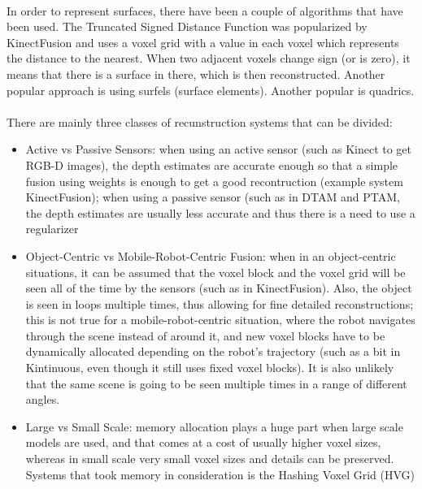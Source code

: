 \documentclass[11pt]{article}
\begin{document}
	\paragraph{}
	In order to represent surfaces, there have been a couple of algorithms that have been used. The Truncated Signed Distance Function was popularized by KinectFusion and uses a voxel grid with a value in each voxel which represents the distance to the nearest. When two adjacent voxels change sign (or is zero), it means that there is a surface in there, which is then reconstructed. Another popular approach is using surfels (surface elements). Another popular is quadrics.
	
	\paragraph{}
	There are mainly three classes of recunstruction systems that can be divided:
	\begin{itemize}
		\item Active vs Passive Sensors: when using an active sensor (such as Kinect to get RGB-D images), the depth estimates are accurate enough so that a simple fusion using weights is enough to get a good recontruction (example system KinectFusion); when using a passive sensor (such as in DTAM and PTAM, the depth estimates are usually less accurate and thus there is a need to use a regularizer
		\item Object-Centric vs Mobile-Robot-Centric Fusion: when in an object-centric situations, it can be assumed that the voxel block and the voxel grid will be seen all of the time by the sensors (such as in KinectFusion). Also, the object is seen in loops multiple times, thus allowing for fine detailed reconstructions; this is not true for a mobile-robot-centric situation, where the robot navigates through the scene instead of around it, and new voxel blocks have to be dynamically allocated depending on the robot's trajectory (such as a bit in Kintinuous, even though it still uses fixed voxel blocks). It is also unlikely that the same scene is going to be seen multiple times in a range of different angles.
		\item Large vs Small Scale: memory allocation plays a huge part when large scale models are used, and that comes at a cost of usually higher voxel sizes, whereas in small scale very small voxel sizes and details can be preserved. Systems that took memory in consideration is the Hashing Voxel Grid (HVG)
	\end{itemize}
	
\end{document}
